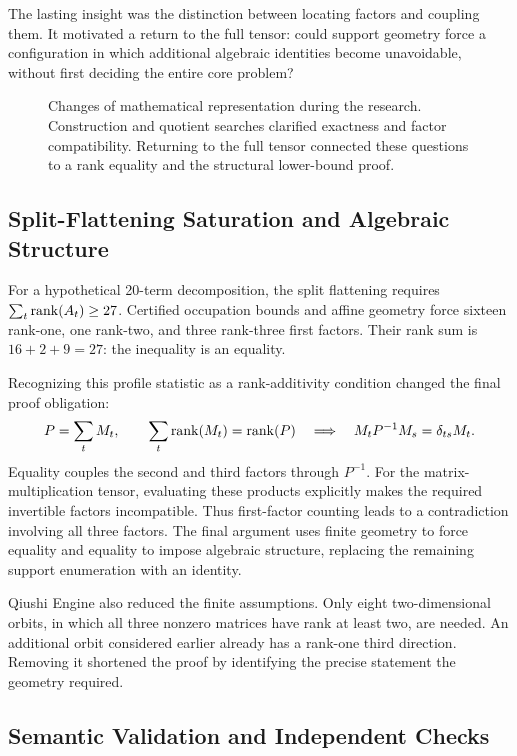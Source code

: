The lasting insight was the distinction between locating factors and
coupling them. It motivated a return to the full tensor: could support
geometry force a configuration in which additional algebraic identities
become unavoidable, without first deciding the entire core problem?

\begin{figure}[tbp]
  \centering
  \makebox[\linewidth][c]{\unskip}
  \caption{Changes of mathematical representation during the research.
  Construction and quotient searches clarified exactness and factor
  compatibility. Returning to the full tensor connected these questions
  to a rank equality and the structural lower-bound proof.}
  \label{fig:research-route}
\end{figure}

\subsection{Split-Flattening Saturation and Algebraic Structure}

For a hypothetical 20-term decomposition, the split flattening requires
$\sum_t\operatorname{rank}(A_t)\ge27$. Certified occupation bounds and affine geometry
force sixteen rank-one, one rank-two, and three rank-three first factors.
Their rank sum is $16+2+9=27$: the inequality is an equality.

Recognizing this profile statistic as a rank-additivity condition changed
the final proof obligation:
\[
  P=\sum_t M_t,\qquad \sum_t\operatorname{rank}(M_t)=\operatorname{rank}(P)
  \quad\Longrightarrow\quad M_tP^{-1}M_s=\delta_{ts}M_t.
\]
Equality couples the second and third factors through $P^{-1}$. For the
matrix-multiplication tensor, evaluating these products explicitly makes
the required invertible factors incompatible. Thus first-factor counting
leads to a contradiction involving all three factors. The final argument
uses finite geometry to force equality and equality to impose algebraic
structure, replacing the remaining support enumeration with an identity.

Qiushi Engine also reduced the finite assumptions. Only eight
two-dimensional orbits, in which all three nonzero matrices have rank
at least two, are needed. An additional orbit considered earlier already
has a rank-one third direction. Removing it shortened the proof by
identifying the precise statement the geometry required.

\subsection{Semantic Validation and Independent Checks}

